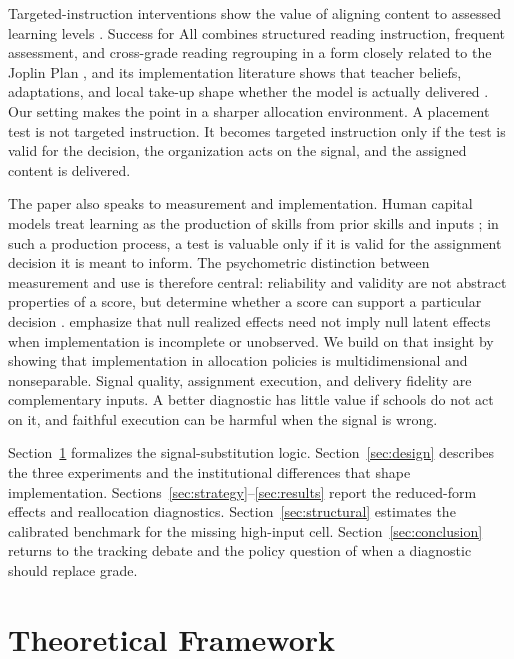 \documentclass[11pt]{article}
\begin{document}
Targeted-instruction interventions show the value of aligning content to assessed learning levels \citep{banerjee2017proof,duflo2020experimental,muralidharan2019disrupting}. Success for All combines structured reading instruction, frequent assessment, and cross-grade reading regrouping in a form closely related to the Joplin Plan \citep{cheung2021success}, and its implementation literature shows that teacher beliefs, adaptations, and local take-up shape whether the model is actually delivered \citep{datnowcastellano2000}. Our setting makes the point in a sharper allocation environment. A placement test is not targeted instruction. It becomes targeted instruction only if the test is valid for the decision, the organization acts on the signal, and the assigned content is delivered.

The paper also speaks to measurement and implementation. Human capital models treat learning as the production of skills from prior skills and inputs \citep{benporath1967,cunhaheckman2007}; in such a production process, a test is valuable only if it is valid for the assignment decision it is meant to inform. The psychometric distinction between measurement and use is therefore central: reliability and validity are not abstract properties of a score, but determine whether a score can support a particular decision \citep{lordnovick1968,cronbachmeehl1955}. \citet{angristmeager2023} emphasize that null realized effects need not imply null latent effects when implementation is incomplete or unobserved. We build on that insight by showing that implementation in allocation policies is multidimensional and nonseparable. Signal quality, assignment execution, and delivery fidelity are complementary inputs. A better diagnostic has little value if schools do not act on it, and faithful execution can be harmful when the signal is wrong.

Section~\ref{sec:theory} formalizes the signal-substitution logic. Section~\ref{sec:design} describes the three experiments and the institutional differences that shape implementation. Sections~\ref{sec:strategy}--\ref{sec:results} report the reduced-form effects and reallocation diagnostics. Section~\ref{sec:structural} estimates the calibrated benchmark for the missing high-input cell. Section~\ref{sec:conclusion} returns to the tracking debate and the policy question of when a diagnostic should replace grade.

\section{Theoretical Framework}
\label{sec:theory}
\end{document}
